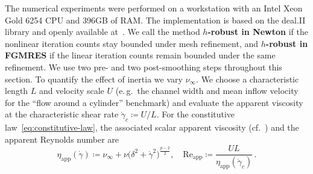 \documentclass[DIV=16]{scrartcl}
\newcommand{\reg}{\delta}
\newcommand{\pn}{p}
\begin{document}
The numerical experiments were performed on a workstation with an Intel Xeon Gold 6254 CPU and 396GB of RAM.
The implementation is based on the deal.II library and openly available
at~\cite{margenberg_scalable_2026}. We call the method \textbf{$h$-robust in Newton} if the nonlinear
iteration counts stay bounded under mesh refinement, and \textbf{$h$-robust in
  FGMRES} if the linear iteration counts remain bounded under the same
refinement. We use two pre- and two post-smoothing steps throughout this
section. To quantify the effect of inertia we vary $\nu_\infty$. We choose a
characteristic length $L$ and velocity scale $U$ (e.\,g.\ the channel width and
mean inflow velocity for the ``flow around a cylinder'' benchmark) and evaluate
the apparent viscosity at the characteristic shear rate
$\dot\gamma_c\coloneq U/L$. For the constitutive
law~\eqref{eq:constitutive-law}, the associated scalar apparent viscosity
(cf.~\cite[Section~4.1]{BirdArmstrongHassager1987DPL1}) and the apparent
Reynolds number are
\begin{equation}\label{eq:reapp}
  \eta_{\mathrm{app}}(\dot\gamma)
  \coloneq \nu_\infty + \nu\bigl(\reg^2+\dot\gamma^2\bigr)^{\frac{\pn-2}{2}},\quad\mathrm{Re}_{\mathrm{app}}
  \coloneq \frac{U L}{\eta_{\mathrm{app}}(\dot\gamma_c)}\,.
\end{equation}
\end{document}
